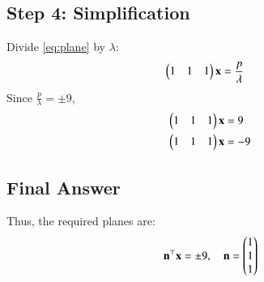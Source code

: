 \documentclass[journal]{IEEEtran}
\begin{document}
\subsection*{Step 4: Simplification}
Divide \eqref{eq:plane} by $\lambda$:
\begin{align}
\begin{pmatrix}1 & 1 & 1\end{pmatrix}\mathbf{x} &= \frac{p}{\lambda}
\end{align}
Since $\tfrac{p}{\lambda} = \pm 9$,
\begin{align}
\begin{pmatrix}1 & 1 & 1\end{pmatrix}\mathbf{x} &= 9 \\
\begin{pmatrix}1 & 1 & 1\end{pmatrix}\mathbf{x} &= -9
\end{align}

\subsection*{Final Answer}
Thus, the required planes are:
\begin{align}
\mathbf{n}^\top \mathbf{x} = \pm 9, \quad \mathbf{n} = \begin{pmatrix}1\\1\\1\end{pmatrix}
\end{align}
\end{document}
